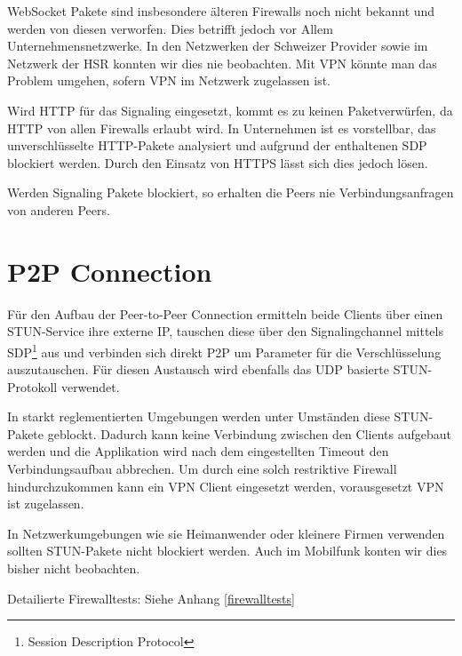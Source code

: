 		WebSocket Pakete sind insbesondere älteren Firewalls noch nicht bekannt und werden von diesen verworfen. Dies betrifft jedoch vor Allem Unternehmensnetzwerke.
		In den Netzwerken der Schweizer Provider sowie im Netzwerk der HSR konnten wir dies nie beobachten.
		Mit VPN könnte man das Problem umgehen, sofern VPN im Netzwerk zugelassen ist.
		
		Wird HTTP für das Signaling eingesetzt, kommt es zu keinen Paketverwürfen, da HTTP von allen Firewalls erlaubt wird.
		In Unternehmen ist es vorstellbar, das unverschlüsselte HTTP-Pakete analysiert und aufgrund der enthaltenen SDP blockiert werden. Durch den Einsatz von HTTPS lässt sich dies jedoch lösen.
		
		Werden Signaling Pakete blockiert, so erhalten die Peers nie Verbindungsanfragen von anderen Peers.
		

	\section{P2P Connection}
		Für den Aufbau der Peer-to-Peer Connection ermitteln beide Clients über einen
		STUN-Service ihre externe IP, tauschen diese über den Signalingchannel
		mittels SDP\footnote{Session Description Protocol} aus und verbinden sich
		direkt P2P um Parameter für die Verschlüsselung auszutauschen. Für diesen
		Austausch wird ebenfalls das UDP basierte STUN-Protokoll verwendet.
		
		In starkt reglementierten Umgebungen werden unter Umständen diese STUN-Pakete
		geblockt. Dadurch kann keine Verbindung zwischen den Clients aufgebaut werden und die Applikation wird nach dem eingestellten Timeout den Verbindungsaufbau abbrechen. 
		Um durch eine solch restriktive Firewall hindurchzukommen kann ein VPN Client eingesetzt werden, vorausgesetzt VPN ist zugelassen.
		
		In Netzwerkumgebungen wie sie Heimanwender oder kleinere Firmen verwenden sollten STUN-Pakete nicht blockiert werden. Auch im Mobilfunk konten wir dies bisher nicht beobachten.
	
		Detailierte Firewalltests: Siehe Anhang \ref{firewalltests}
		
		